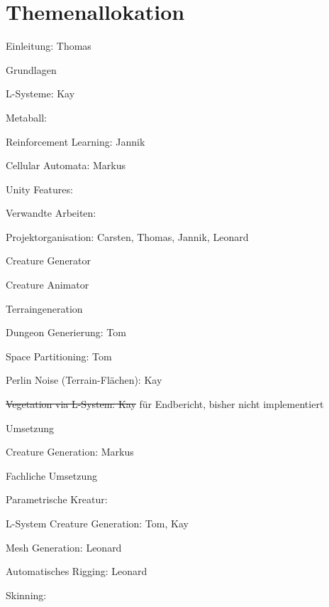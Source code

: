 \chapter*{Themenallokation} 

\begin{thallok}
	\item Einleitung: Thomas
	\item Grundlagen
	\begin{thallok}
		\item L-Systeme: Kay
		\item Metaball: 
		\item Reinforcement Learning: Jannik
		\item Cellular Automata: Markus
		\item Unity Features: 		
	\end{thallok}
	\item Verwandte Arbeiten: 
	\item Projektorganisation: Carsten, Thomas, Jannik, Leonard
	\begin{thallok}
		\item Creature Generator
		\item Creature Animator
		\item Terraingeneration
		\begin{thallok}
			\item Dungeon Generierung: Tom
			\item Space Partitioning: Tom
			\item Perlin Noise (Terrain-Flächen): Kay
			\item \sout{Vegetation via L-System: Kay} für Endbericht, bisher nicht implementiert
		\end{thallok}
	\end{thallok}
	\item Umsetzung
	\begin{thallok}
		\item Creature Generation: Markus
		\begin{thallok}
			\item Fachliche Umsetzung
				\begin{thallok}
					\item Parametrische Kreatur:
					\item L-System Creature Generation: Tom, Kay
					\item Mesh Generation: Leonard
					\item Automatisches Rigging: Leonard
					\item Skinning: 

\end{thallok}
\end{thallok}
\end{thallok}
\end{thallok}
